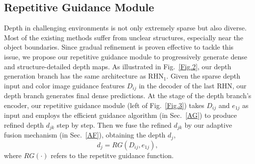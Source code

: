 \documentclass[runningheads]{llncs}
\begin{document}
\subsection{Repetitive Guidance Module}\label{RG}
Depth in challenging environments is not only extremely sparse but also diverse. Most of the existing methods suffer from unclear structures, especially near the object boundaries. Since gradual refinement is proven effective \cite{Cheng2020CSPN,park2020nonlocal,xu2020deformable} to tackle this issue, we propose our repetitive guidance module to progressively generate dense and structure-detailed depth maps. As illustrated in Fig.~\ref{Fig.2}, our depth generation branch has the same architecture as RHN$_1$. Given the sparse depth input and color image guidance features $D_{ij}$ in the decoder of the last RHN, our depth branch generates final dense predictions. At the stage of the depth branch's encoder, our repetitive guidance module (left of Fig.~\ref{Fig.3}) takes $D_{ij}$ and $e_{1j}$ as input and employs the efficient guidance algorithm (in Sec.~\ref{AG}) to produce refined depth $d_{jk}$ step by step. Then we fuse the refined $d_{jk}$ by our adaptive fusion mechanism (in Sec.~\ref{AF}), obtaining the depth $d_j$, \begin{equation}\label{e2}
{{d}_{j}}=RG\left( {{D}_{ij}},{{e}_{1j}} \right),
\end{equation}
where ${RG}\left( \cdot \right)$ refers to the repetitve guidance function.
\vspace{-15pt}
\end{document}
